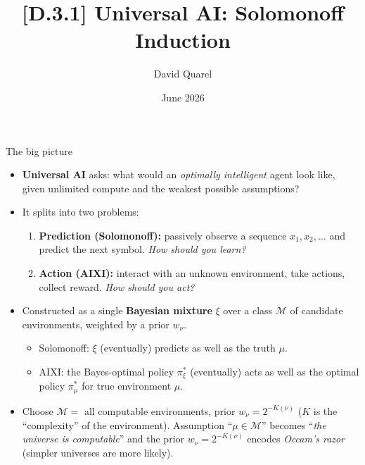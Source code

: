 \documentclass[10pt]{beamer}
\newcommand{\cM}{\mathcal{M}}
\begin{document}
\title[Solomonoff: a speedrun]{[D.3.1] Universal AI: Solomonoff Induction}
\author[David Quarel]{David Quarel}
\date{June 2026}

\frame{\titlepage}

\begin{frame}{The big picture}
\begin{itemize}
    \item \textbf{Universal AI} asks: what would an \emph{optimally intelligent} agent look like, given unlimited compute and the weakest possible assumptions?
    \pause
    \item It splits into two problems:
    \begin{enumerate}
        \item \textbf{Prediction (Solomonoff):} passively observe a sequence $x_1, x_2, \ldots$ and predict the next symbol. \emph{How should you learn?}
        \pause
        \item \textbf{Action (AIXI):} interact with an unknown environment, take actions, collect reward. \emph{How should you act?}
    \end{enumerate}
    \pause
    \item Constructed as a single \textbf{Bayesian mixture} $\xi$ over a class $\cM$ of candidate environments, weighted by a prior $w_\nu$.
    \begin{itemize}
        \item Solomonoff: $\xi$ (eventually) predicts as well as the truth $\mu$.
        \item AIXI: the Bayes-optimal policy $\pi_\xi^*$ (eventually) acts as well as the optimal policy $\pi_\mu^*$ for true environment $\mu$.
    \end{itemize}
    \pause
    \item Choose $\cM=$ all computable environments, prior $w_\nu = 2^{-K(\nu)}$ ($K$ is the ``complexity'' of the environment). Assumption ``$\mu\in\cM$'' becomes ``\emph{the universe is computable}'' and the prior 
    $w_\nu = 2^{-K(\nu)}$ encodes \emph{Occam's razor} (simpler universes are more likely).
\end{itemize}
\end{frame}

\end{document}
